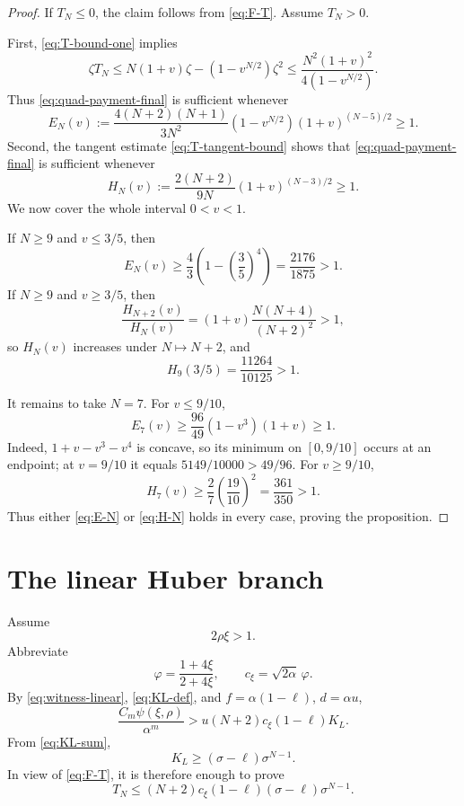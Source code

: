 \documentclass[11pt]{article}
\begin{document}
\begin{proof}
If \(T_N\le0\), the claim follows from \eqref{eq:F-T}.  Assume
\(T_N>0\).

First, \eqref{eq:T-bound-one} implies
\[
 \zeta T_N
 \le N(1+v)\zeta-(1-v^{N/2})\zeta^2
 \le\frac{N^2(1+v)^2}{4(1-v^{N/2})}.
\]
Thus \eqref{eq:quad-payment-final} is sufficient whenever
\begin{equation}\label{eq:E-N}
 E_N(v):=
 \frac{4(N+2)(N+1)}{3N^2}
 (1-v^{N/2})(1+v)^{(N-5)/2}\ge1.
\end{equation}
Second, the tangent estimate \eqref{eq:T-tangent-bound} shows that
\eqref{eq:quad-payment-final} is sufficient whenever
\begin{equation}\label{eq:H-N}
 H_N(v):=
 \frac{2(N+2)}{9N}(1+v)^{(N-3)/2}\ge1.
\end{equation}
We now cover the whole interval \(0<v<1\).

If \(N\ge9\) and \(v\le3/5\), then
\[
 E_N(v)\ge\frac43\left(1-\left(\frac35\right)^4\right)
 =\frac{2176}{1875}>1.
\]
If \(N\ge9\) and \(v\ge3/5\), then
\[
 \frac{H_{N+2}(v)}{H_N(v)}
 =(1+v)\frac{N(N+4)}{(N+2)^2}>1,
\]
so \(H_N(v)\) increases under \(N\mapsto N+2\), and
\[
       H_9(3/5)=\frac{11264}{10125}>1.
\]

It remains to take \(N=7\).  For \(v\le9/10\),
\[
 E_7(v)\ge\frac{96}{49}(1-v^3)(1+v)\ge1.
\]
Indeed, \(1+v-v^3-v^4\) is concave, so its minimum on
\([0,9/10]\) occurs at an endpoint; at \(v=9/10\) it equals
\(5149/10000>49/96\).  For \(v\ge9/10\),
\[
       H_7(v)\ge\frac27\left(\frac{19}{10}\right)^2
       =\frac{361}{350}>1.
\]
Thus either \eqref{eq:E-N} or \eqref{eq:H-N} holds in every case, proving
the proposition.
\end{proof}

\section{The linear Huber branch}\label{sec:linear}

Assume
\begin{equation}\label{eq:linear-branch}
       2\rho\xi>1.
\end{equation}
Abbreviate
\begin{equation}\label{eq:varphi-cxi}
       \varphi=\frac{1+4\xi}{2+4\xi},
       \qquad
       c_\xi=\sqrt{2\alpha}\,\varphi.
\end{equation}
By \eqref{eq:witness-linear}, \eqref{eq:KL-def}, and
\(f=\alpha(1-\ell)\), \(d=\alpha u\),
\begin{equation}\label{eq:linear-payment-start}
 \frac{C_m\psi(\xi,\rho)}{\alpha^m}
 >u(N+2)c_\xi(1-\ell)K_L.
\end{equation}
From \eqref{eq:KL-sum},
\begin{equation}\label{eq:KL-first-term}
       K_L\ge(\sigma-\ell)\sigma^{N-1}.
\end{equation}
In view of \eqref{eq:F-T}, it is therefore enough to prove
\begin{equation}\label{eq:linear-core}
       T_N\le
       (N+2)c_\xi(1-\ell)(\sigma-\ell)\sigma^{N-1}.
\end{equation}
\end{document}
